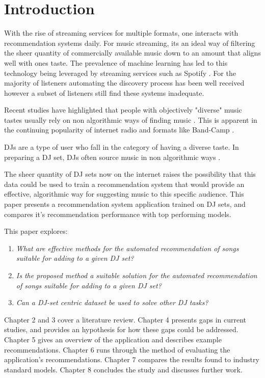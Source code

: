 
\graphicspath{{Chapter1/}}


\chapter{Introduction}
With the rise of streaming services for multiple formats, one interacts with recommendation systems daily. For music streaming, its an ideal way of filtering the sheer quantity of commercially available music down to an amount that aligns well with ones taste. The prevalence of machine learning has led to this technology being leveraged by streaming services such as Spotify \citep{httpsresearchatspotifycommachine-learning_machine_2023}. For the majority of listeners automating the discovery process has been well received however a subset of listeners still find these systems inadequate.

Recent studies have highlighted that people with objectively "diverse" music tastes usually rely on non algorithmic ways of finding music \citep{anderson_algorithmic_2020}. This is apparent in the continuing popularity of internet radio and formats like Band-Camp \citep{market_research_future_internet_2022} \citep{roberts_anti-spotify_2020}. 

DJs are a type of user who fall in the category of having a diverse taste. In preparing a DJ set, DJs often source music in non algorithmic ways \citep{allen_djs_2021}.

 The sheer quantity of DJ sets now on the internet raises the possibility that this data could be used to train a recommendation system that would provide an effective, algorithmic way for suggesting music to this specific audience. This paper presents a recommendation system application trained on DJ sets, and compares it's recommendation performance with top performing models.

This paper explores:

\begin{enumerate}
	\item \textit{What are effective methods for the automated recommendation of songs suitable for adding to a given DJ set?}
	\item \textit{Is the proposed method a suitable solution for the automated recommendation of songs suitable for adding to a given DJ set?}
	\item \textit{Can a DJ-set centric dataset be used to solve other DJ tasks?}
\end{enumerate}

Chapter 2 and 3 cover a literature review. Chapter 4 presents gaps in current studies, and provides an hypothesis for how these gaps could be addressed. Chapter 5 gives an overview of the application and describes example recommendations. Chapter 6 runs through the method of evaluating the application's recommendations. Chapter 7 compares the results found to industry standard models. Chapter 8 concludes the study and discusses further work.
 